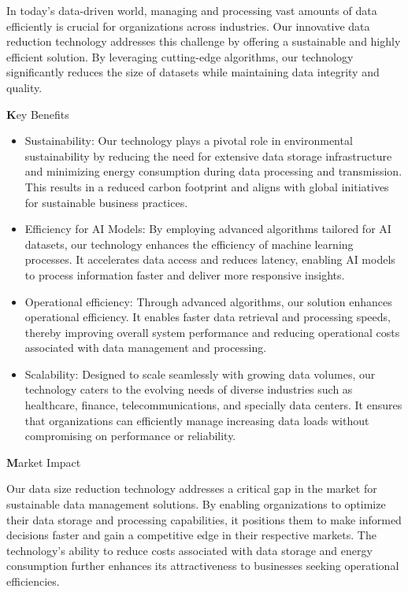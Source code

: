 In today's data-driven world, managing and processing vast amounts of data efficiently is crucial for organizations across industries. Our innovative data reduction technology addresses this challenge by offering a sustainable and highly efficient solution. By leveraging cutting-edge algorithms, our technology significantly reduces the size of datasets while maintaining data integrity and quality.

{\textbf Key Benefits}

\begin{itemize}
\item Sustainability: Our technology plays a pivotal role in environmental sustainability by reducing the need for extensive data storage infrastructure and minimizing energy consumption during data processing and transmission. This results in a reduced carbon footprint and aligns with global initiatives for sustainable business practices.

\item Efficiency for AI Models: By employing advanced algorithms tailored for AI datasets, our technology enhances the efficiency of machine learning processes. It accelerates data access and reduces latency, enabling AI models to process information faster and deliver more responsive insights.

\item Operational efficiency: Through advanced algorithms, our solution enhances operational efficiency. It enables faster data retrieval and processing speeds, thereby improving overall system performance and reducing operational costs associated with data management and processing.

\item Scalability: Designed to scale seamlessly with growing data volumes, our technology caters to the evolving needs of diverse industries such as healthcare, finance, telecommunications, and specially data centers. It ensures that organizations can efficiently manage increasing data loads without compromising on performance or reliability.

\end{itemize}

{\textbf Market Impact}

Our data size reduction technology addresses a critical gap in the market for sustainable data management solutions. By enabling organizations to optimize their data storage and processing capabilities, it positions them to make informed decisions faster and gain a competitive edge in their respective markets. The technology's ability to reduce costs associated with data storage and energy consumption further enhances its attractiveness to businesses seeking operational efficiencies.

